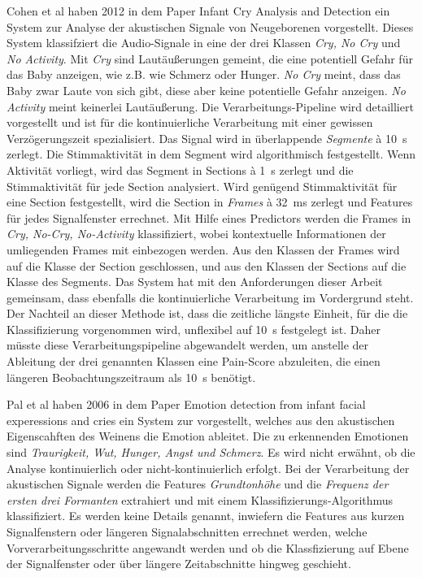 Cohen et al haben 2012 in dem Paper \glqq Infant Cry Analysis and Detection \grqq{} \cite{cohenCry}  ein System zur Analyse der akustischen Signale von Neugeborenen vorgestellt. Dieses System klassifziert die Audio-Signale in eine der drei Klassen \emph{Cry, No Cry} und \emph{No Activity}. Mit \emph{Cry} sind Lautäußerungen gemeint, die eine potentiell Gefahr für das Baby anzeigen, wie z.B. wie Schmerz oder Hunger. \emph{No Cry} meint, dass das Baby zwar Laute von sich gibt, diese aber keine potentielle Gefahr anzeigen. \emph{No Activity} meint keinerlei Lautäußerung. Die Verarbeitungs-Pipeline wird detailliert vorgestellt und ist für die kontinuierliche Verarbeitung mit einer gewissen Verzögerungszeit spezialisiert. Das Signal wird in überlappende \emph{Segmente} \`{a} \SI{10}{\second} zerlegt. Die Stimmaktivität in dem Segment wird algorithmisch festgestellt. Wenn Aktivität vorliegt, wird das Segment in Sections \`{a} \SI{1}{\second} zerlegt und die Stimmaktivität für jede Section analysiert. Wird genügend Stimmaktivität für eine Section festgestellt, wird die Section in \emph{Frames} \`{a} \SI{32}{\milli\second} zerlegt und Features für jedes Signalfenster errechnet. Mit Hilfe eines Predictors werden die Frames in \emph{Cry, No-Cry, No-Activity} klassifiziert, wobei kontextuelle Informationen der umliegenden Frames mit einbezogen werden. Aus den Klassen der Frames wird auf die Klasse der Section geschlossen, und aus den Klassen der Sections auf die Klasse des Segments. Das System hat mit den Anforderungen dieser Arbeit gemeinsam, dass ebenfalls die kontinuierliche Verarbeitung im Vordergrund steht. Der Nachteil an dieser Methode ist, dass die zeitliche längste Einheit, für die die Klassifizierung vorgenommen wird, unflexibel auf \SI{10}{\second} festgelegt ist. Daher müsste diese Verarbeitungspipeline abgewandelt werden, um anstelle der Ableitung der drei genannten Klassen eine Pain-Score abzuleiten, die einen längeren Beobachtungszeitraum als \SI{10}{\second} benötigt.

Pal et al  haben 2006 in dem Paper \glqq Emotion detection from infant facial experessions and cries\grqq{} \cite{palEmotion} ein System zur vorgestellt, welches aus den akustischen Eigenscahften des Weinens die Emotion ableitet. Die zu erkennenden Emotionen sind \emph{Traurigkeit, Wut, Hunger, Angst und Schmerz}. Es wird nicht erwähnt, ob die Analyse kontinuierlich oder nicht-kontinuierlich erfolgt. Bei der Verarbeitung der akustischen Signale werden die Features \emph{Grundtonhöhe} und die \emph{Frequenz der ersten drei Formanten} extrahiert und mit einem Klassifizierungs-Algorithmus klassifiziert. Es werden keine Details genannt, inwiefern die Features aus kurzen Signalfenstern oder längeren Signalabschnitten errechnet werden, welche Vorverarbeitungsschritte angewandt werden und ob die Klassfizierung auf Ebene der Signalfenster oder über längere Zeitabschnitte hingweg geschieht.

